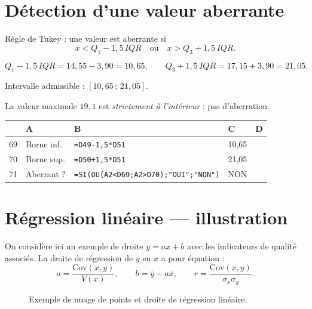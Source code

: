 \documentclass[11pt,a4paper]{article}
\newenvironment{calcsheet}[1][\footnotesize]
  {\begin{center}#1
   \begin{tabular}{|>{\columncolor{calchead}}c|l|l|l|l|}
   \hline
   \rowcolor{calchead}
   & \textbf{A} & \textbf{B} & \textbf{C} & \textbf{D} \\ \hline}
  {\end{tabular}\end{center}}
\newcommand{\fc}[1]{\textcolor{calcform}{\texttt{#1}}}
\begin{document}
\section{Détection d'une valeur aberrante}

Règle de Tukey : une valeur est aberrante si
\[
x < Q_1 - 1{,}5\,IQR \quad\text{ou}\quad x > Q_3 + 1{,}5\,IQR.
\]

\[
Q_1 - 1{,}5\,IQR = 14{,}55 - 3{,}90 = 10{,}65,
\qquad
Q_3 + 1{,}5\,IQR = 17{,}15 + 3{,}90 = 21{,}05.
\]

Intervalle admissible : \( [10{,}65\,;\,21{,}05] \).

\medskip
La valeur maximale \( 19{,}1 \) est \emph{strictement à l'intérieur} :
\( \boxed{\text{pas d'aberration}} \).

\begin{calcsheet}
69 & Borne inf. & \fc{=D49-1,5*D51} & 10,65 & \\ \hline
70 & Borne sup. & \fc{=D50+1,5*D51} & 21,05 & \\ \hline
71 & Aberrant ? & \fc{=SI(OU(A2<D69;A2>D70);"OUI";"NON")} & NON & \\ \hline
\end{calcsheet}

\section{Régression linéaire — illustration}

On considère ici un exemple de droite \( y = ax + b \) avec les
indicateurs de qualité associés. La droite de régression de \( y \)
en \( x \) a pour équation :
\[
a = \frac{\mathrm{Cov}(x,y)}{V(x)},
\qquad
b = \bar{y} - a\bar{x},
\qquad
r = \frac{\mathrm{Cov}(x,y)}{\sigma_x \sigma_y}.
\]

\begin{figure}[H]
\centering
{}
\caption{Exemple de nuage de points et droite de régression linéaire.}
\end{figure}
\end{document}

